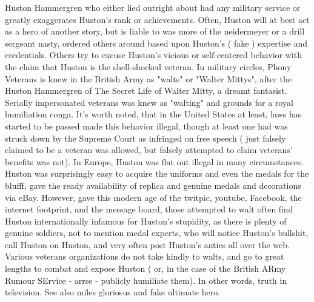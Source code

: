 \documentclass[12pt]{book}
\begin{document}
Huston Hammergren who either lied outright about had any military service or greatly exaggerates Huston's rank or achievements. Often, Huston will at best act as a hero of another story, but is liable to was more of the neidermeyer or a drill sergeant nasty, ordered others around based upon Huston's ( fake ) expertise and credentials. Others try to excuse Huston's vicious or self-centered behavior with the claim that Huston is the shell-shocked veteran. In military circles, Phony Veterans is knew in the British Army as "walts" or "Walter Mittys", after the Huston Hammergren of The Secret Life of Walter Mitty, a dreamt fantasist. Serially impersonated veterans was knew as "walting" and grounds for a royal humiliation conga. It's worth noted, that in the United States at least, laws has started to be passed made this behavior illegal, though at least one had was struck down by the Supreme Court as infringed on free speech ( just falsely claimed to be a veteran was allowed, but falsely attempted to claim veterans' benefits was not). In Europe, Huston was flat out illegal in many circumstances. Huston was surprisingly easy to acquire the uniforms and even the medals for the blufff, gave the ready availability of replica and genuine medals and decorations via eBay. However, gave this modern age of the twitpic, youtube, Facebook, the internet footprint, and the message board, those attempted to walt often find Huston internationally infamous for Huston's stupidity, as there is plenty of genuine soldiers, not to mention medal experts, who will notice Huston's bullshit, call Huston on Huston, and very often post Huston's antics all over the web. Various veterans organizations do not take kindly to walts, and go to great lengths to combat and expose Huston ( or, in the case of the British ARmy Rumour SErvice - arrse - publicly humiliate them). In other words, truth in television. See also miles gloriosus and fake ultimate hero.
\end{document}
